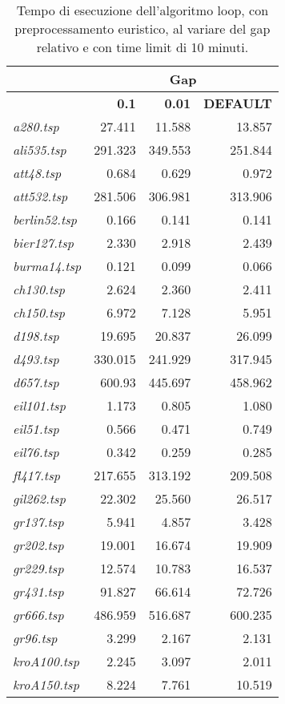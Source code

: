{\footnotesize
\begin{longtable}[H]{lrrr}
\caption{Tempo di esecuzione dell'algoritmo loop, con preprocessamento euristico, al variare del gap relativo e con time limit di 10 minuti.}\\
\cline{2-4}
{} & \multicolumn{3}{c}{\textbf{Gap}}\\
\hline
{} & \textbf{0.1} & \textbf{0.01} & \textbf{DEFAULT}\\
\hline
\textit{a280.tsp} & 27.411 & 11.588 & 13.857\\
\textit{ali535.tsp} & 291.323 & 349.553 & 251.844\\
\textit{att48.tsp} & 0.684 & 0.629 & 0.972\\
\textit{att532.tsp} & 281.506 & 306.981 & 313.906\\
\textit{berlin52.tsp} & 0.166 & 0.141 & 0.141\\
\textit{bier127.tsp} & 2.330 & 2.918 & 2.439\\
\textit{burma14.tsp} & 0.121 & 0.099 & 0.066\\
\textit{ch130.tsp} & 2.624 & 2.360 & 2.411\\
\textit{ch150.tsp} & 6.972 & 7.128 & 5.951\\
\textit{d198.tsp} & 19.695 & 20.837 & 26.099\\
\textit{d493.tsp} & 330.015 & 241.929 & 317.945\\
\textit{d657.tsp} & 600.93 & 445.697 & 458.962\\
\textit{eil101.tsp} & 1.173 & 0.805 & 1.080\\
\textit{eil51.tsp} & 0.566 & 0.471 & 0.749\\
\textit{eil76.tsp} & 0.342 & 0.259 & 0.285\\
\textit{fl417.tsp} & 217.655 & 313.192 & 209.508\\
\textit{gil262.tsp} & 22.302 & 25.560 & 26.517\\
\textit{gr137.tsp} & 5.941 & 4.857 & 3.428\\
\textit{gr202.tsp} & 19.001 & 16.674 & 19.909\\
\textit{gr229.tsp} & 12.574 & 10.783 & 16.537\\
\textit{gr431.tsp} & 91.827 & 66.614 & 72.726\\
\textit{gr666.tsp} & 486.959 & 516.687 & 600.235\\
\textit{gr96.tsp} & 3.299 & 2.167 & 2.131\\
\textit{kroA100.tsp} & 2.245 & 3.097 & 2.011\\
\textit{kroA150.tsp} & 8.224 & 7.761 & 10.519\\

\end{longtable}}
